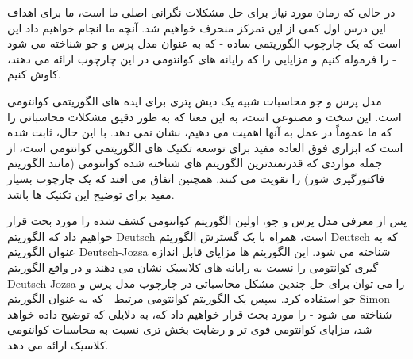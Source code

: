 \documentclass{book}
\begin{document}
در حالی که زمان مورد نیاز برای حل مشکلات نگرانی اصلی ما است، ما برای اهداف این درس اول کمی از این تمرکز منحرف خواهیم شد. آنچه ما انجام خواهیم داد این است که یک چارچوب الگوریتمی ساده - که به عنوان مدل پرس و جو شناخته می شود - را فرموله کنیم و مزایایی را که رایانه های کوانتومی در این چارچوب ارائه می دهند، کاوش کنیم.

مدل پرس و جو محاسبات شبیه یک دیش پتری برای ایده های الگوریتمی کوانتومی است. این سخت و مصنوعی است، به این معنا که به طور دقیق مشکلات محاسباتی را که ما عموماً در عمل به آنها اهمیت می دهیم، نشان نمی دهد. با این حال، ثابت شده است که ابزاری فوق العاده مفید برای توسعه تکنیک های الگوریتمی کوانتومی است، از جمله مواردی که قدرتمندترین الگوریتم های شناخته شده کوانتومی (مانند الگوریتم فاکتورگیری شور) را تقویت می کنند. همچنین اتفاق می افتد که یک چارچوب بسیار مفید برای توضیح این تکنیک ها باشد.

پس از معرفی مدل پرس و جو، اولین الگوریتم کوانتومی کشف شده را مورد بحث قرار خواهیم داد که الگوریتم Deutsch است، همراه با یک گسترش الگوریتم Deutsch که به عنوان الگوریتم Deutsch-Jozsa شناخته می شود. این الگوریتم ها مزایای قابل اندازه گیری کوانتومی را نسبت به رایانه های کلاسیک نشان می دهند و در واقع الگوریتم Deutsch-Jozsa را می توان برای حل چندین مشکل محاسباتی در چارچوب مدل پرس و جو استفاده کرد. سپس یک الگوریتم کوانتومی مرتبط - که به عنوان الگوریتم Simon شناخته می شود - را مورد بحث قرار خواهیم داد که، به دلایلی که توضیح داده خواهد شد، مزایای کوانتومی قوی تر و رضایت بخش تری نسبت به محاسبات کوانتومی کلاسیک ارائه می دهد.


\subsection{}

\subsection{}

\subsection{}


\subsection{}
\end{document}
